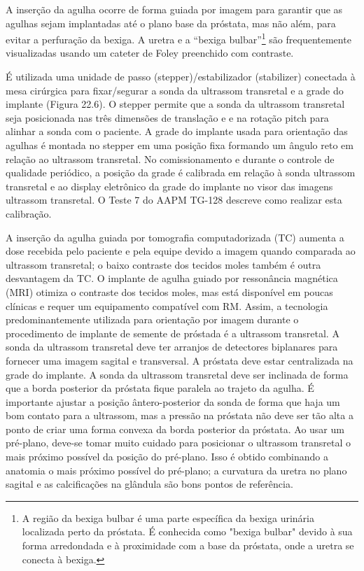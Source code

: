 \documentclass[11pt,a4paper]{article}
\begin{document}
	A inserção da agulha ocorre de forma guiada por imagem para garantir que as agulhas sejam implantadas até o plano base da próstata, mas não além, para evitar a perfuração da bexiga. A uretra e a ``bexiga bulbar''\footnote{A região da bexiga bulbar é uma parte específica da bexiga urinária localizada perto da próstata. É conhecida como "bexiga bulbar" devido à sua forma arredondada e à proximidade com a base da próstata, onde a uretra se conecta à bexiga.} são frequentemente visualizadas usando um cateter de Foley preenchido com contraste.

	É utilizada uma unidade de passo (stepper)/estabilizador (stabilizer) conectada à mesa cirúrgica para fixar/segurar a sonda da ultrassom transretal e a grade do implante (Figura 22.6). O stepper permite que a sonda da ultrassom transretal seja posicionada nas três dimensões de translação e e na rotação pitch para alinhar a sonda com o paciente. A grade do implante usada para orientação das agulhas é montada no stepper em uma posição fixa formando um ângulo reto em relação ao ultrassom transretal. No comissionamento e durante o controle de qualidade periódico, a posição da grade é calibrada em relação à sonda ultrassom transretal e ao display eletrônico da grade do implante no visor das imagens ultrassom transretal. O Teste 7 do AAPM TG-128 descreve como realizar esta calibração.

	A inserção da agulha guiada por tomografia computadorizada (TC) aumenta a dose recebida pelo paciente e pela equipe devido a imagem quando comparada ao ultrassom transretal; o baixo contraste dos tecidos moles também é outra desvantagem da TC. O implante de agulha guiado por ressonância magnética (MRI) otimiza o contraste dos tecidos moles, mas está disponível em poucas clínicas e requer um  equipamento compatível com RM. Assim, a tecnologia predominantemente utilizada para orientação por imagem durante o procedimento de implante de semente de próstada é a ultrassom transretal. A sonda da ultrassom transretal deve ter arranjos de detectores biplanares para fornecer uma imagem sagital e transversal. A próstata deve estar centralizada na grade do implante. A sonda da ultrassom transretal deve ser inclinada de forma que a borda posterior da próstata fique paralela ao trajeto da agulha. É importante ajustar a posição ântero-posterior da sonda de forma que haja um bom contato para a ultrassom, mas a pressão na próstata não deve ser tão alta a ponto de criar uma forma convexa da borda posterior da próstata. Ao usar um pré-plano, deve-se tomar muito cuidado para posicionar o ultrassom transretal o mais próximo possível da posição do pré-plano. Isso é obtido combinando a anatomia o mais próximo possível do pré-plano; a curvatura da uretra no plano sagital e as calcificações na glândula são bons pontos de referência.
\end{document}
